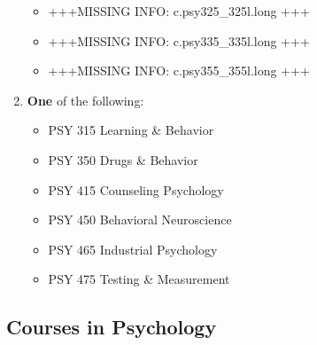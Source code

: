 \documentclass[
  letterpaper,
]{scrbook}
\providecommand{\tightlist}{%
  \setlength{\itemsep}{0pt}\setlength{\parskip}{0pt}}
\begin{document}
\begin{enumerate}
  \begin{itemize}
  \tightlist
  \item
    +++MISSING INFO: c.psy325\_325l.long +++
  \item
    +++MISSING INFO: c.psy335\_335l.long +++
  \item
    +++MISSING INFO: c.psy355\_355l.long +++
  \end{itemize}
\item
  \textbf{One} of the following:

  \begin{itemize}
  \tightlist
  \item
    PSY 315 Learning \& Behavior
  \item
    PSY 350 Drugs \& Behavior
  \item
    PSY 415 Counseling Psychology
  \item
    PSY 450 Behavioral Neuroscience
  \item
    PSY 465 Industrial Psychology
  \item
    PSY 475 Testing \& Measurement
  \end{itemize}
\end{enumerate}

\subsection{Courses in Psychology}\label{courses-in-psychology}
\end{document}
